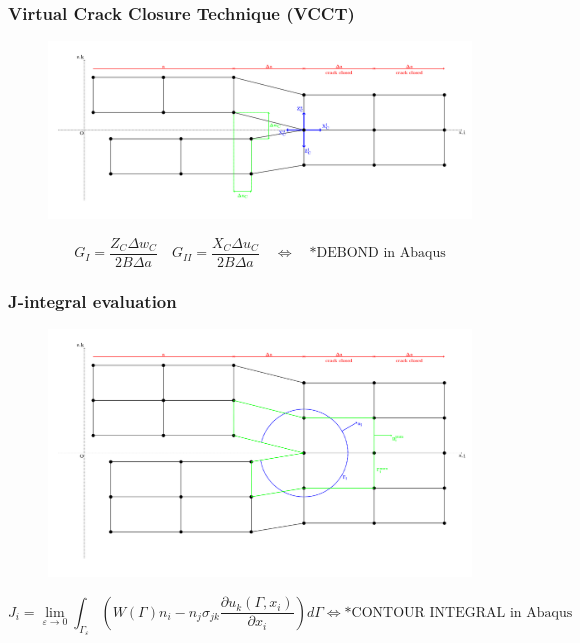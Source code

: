 \documentclass[first,firstsupp,lastsupp,handout,last,hyperref,table]{ETHclass}
\begin{document}
\begin{frame}
\frametitle{Virtual Crack Closure Technique (VCCT)}
\vspace{-1.5cm}
\centering
\begin{figure}[!h]
\centering
\includegraphics[height=0.6\textheight]{VCCT.pdf}
  \label{fig:vcct}
\end{figure}
\begin{equation*}
G_{I}=\frac{Z_{C}\Delta w_{C}}{2B\Delta a}\quad G_{II}=\frac{X_{C}\Delta u_{C}}{2B\Delta a}\quad\Longleftrightarrow\quad\text{*DEBOND in Abaqus}
\end{equation*}
\end{frame}

\begin{frame}
\frametitle{J-integral evaluation}
\vspace{-0.75cm}
\centering
\begin{figure}[!h]
\centering
\includegraphics[height=0.6\textheight]{J-integral.pdf}
  \label{fig:jintegral}
\end{figure}
\scriptsize
\begin{equation*}
J_{i}=\lim_{\varepsilon\to 0}\int_{\Gamma_{\varepsilon}}\left(W\left(\Gamma\right)n_{i}-n_{j}\sigma_{jk}\frac{\partial u_{k}\left(\Gamma,x_{i}\right)}{\partial x_{i}}\right)d\Gamma\Longleftrightarrow\text{*CONTOUR INTEGRAL in Abaqus}
\end{equation*}
\end{frame}
\end{document}
